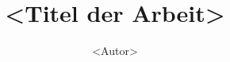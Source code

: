 \title{<Titel der Arbeit>}
\subtitle{}

\author{<Autor>}
\matriculationnumber{}

\modulenumber{}
\modulename{}
\lecturer{}

\transfermodulenumber{}
\centurion{}

\studyprogramme{}

\phonenumber{}
\mailaddress{}

\dateStart{}
\dateFinish{}

\appraiser{}
\coappraiser{}

\supervisor{}
\supervisoraddress{}
\supervisorphonenumber{}
\supervisormailaddress{}